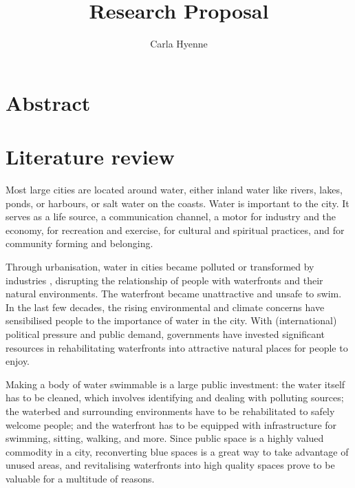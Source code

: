 \documentclass{article}
\title{Research Proposal}
\author{Carla Hyenne}
\date{}
\begin{document}
\maketitle

\tableofcontents 


\section{Abstract}


\pagebreak
\section{Literature review}

Most large cities are located around water, either inland water like rivers, lakes, ponds, or harbours, or salt water on the coasts.
Water is important to the city. It serves as a life source, a communication channel, a motor for industry and the economy, for recreation and exercise, for cultural and spiritual practices, and for community forming and belonging.

Through urbanisation, water in cities became polluted or transformed by industries \parencite{kampa_langaas_anzaldua_2016}, disrupting the relationship of people with waterfronts and their natural environments. The waterfront became unattractive and unsafe to swim.
In the last few decades, the rising environmental and climate concerns have sensibilised people to the importance of water in the city. With (international) political pressure and public demand, governments have invested significant resources in rehabilitating waterfronts into attractive natural places for people to enjoy.

Making a body of water swimmable is a large public investment: the water itself has to be cleaned, which involves identifying and dealing with polluting sources; the waterbed and surrounding environments have to be rehabilitated to safely welcome people; and the waterfront has to be equipped with infrastructure for swimming, sitting, walking, and more. Since public space is a highly valued commodity in a city, reconverting blue spaces is a great way to take advantage of unused areas, and revitalising waterfronts into high quality spaces prove to be valuable for a multitude of reasons. 
\end{document}
